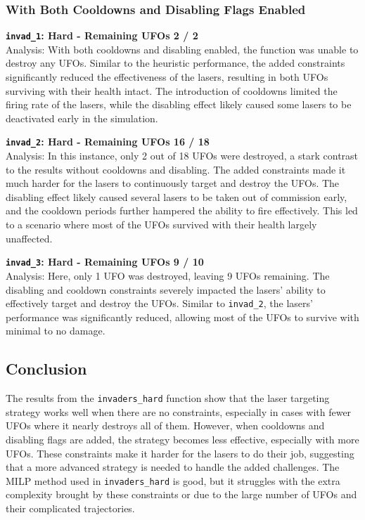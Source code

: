 \documentclass[12pt]{article}
\begin{document}
\subsubsection{With Both Cooldowns and Disabling Flags Enabled}
\textbf{\texttt{invad\_1}: Hard - Remaining UFOs 2 / 2}\\
Analysis: With both cooldowns and disabling enabled, the function was unable to destroy any UFOs. Similar to the heuristic performance, the added constraints significantly reduced the effectiveness of the lasers, resulting in both UFOs surviving with their health intact. The introduction of cooldowns limited the firing rate of the lasers, while the disabling effect likely caused some lasers to be deactivated early in the simulation.

\textbf{\texttt{invad\_2}: Hard - Remaining UFOs 16 / 18}\\
Analysis: In this instance, only 2 out of 18 UFOs were destroyed, a stark contrast to the results without cooldowns and disabling. The added constraints made it much harder for the lasers to continuously target and destroy the UFOs. The disabling effect likely caused several lasers to be taken out of commission early, and the cooldown periods further hampered the ability to fire effectively. This led to a scenario where most of the UFOs survived with their health largely unaffected.

\textbf{\texttt{invad\_3}: Hard - Remaining UFOs 9 / 10}\\
Analysis: Here, only 1 UFO was destroyed, leaving 9 UFOs remaining. The disabling and cooldown constraints severely impacted the lasers' ability to effectively target and destroy the UFOs. Similar to \texttt{invad\_2}, the lasers' performance was significantly reduced, allowing most of the UFOs to survive with minimal to no damage.

\subsection{Conclusion}
The results from the \texttt{invaders\_hard} function show that the laser targeting strategy works well when there are no constraints, especially in cases with fewer UFOs where it nearly destroys all of them. However, when cooldowns and disabling flags are added, the strategy becomes less effective, especially with more UFOs. These constraints make it harder for the lasers to do their job, suggesting that a more advanced strategy is needed to handle the added challenges. The MILP method used in \texttt{invaders\_hard} is good, but it struggles with the extra complexity brought by these constraints or due to the large number of UFOs and their complicated trajectories.
\end{document}
